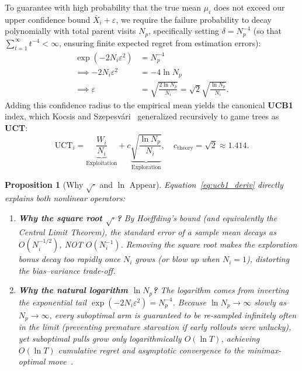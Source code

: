 \documentclass[conference]{IEEEtran}
\newtheorem{proposition}{Proposition}
\begin{document}
To guarantee with high probability that the true mean $\mu_i$ does not exceed our upper confidence bound $\bar{X}_i + \varepsilon$, we require the failure probability to decay polynomially with total parent visits $N_p$, specifically setting $\delta = N_p^{-4}$ (so that $\sum_{t=1}^{\infty} t^{-4} < \infty$, ensuring finite expected regret from estimation errors):
\begin{align}
\exp(-2 N_i \varepsilon^2) &= N_p^{-4} \nonumber \\
\implies -2 N_i \varepsilon^2 &= -4 \ln N_p \nonumber \\
\implies \varepsilon &= \sqrt{\frac{2 \ln N_p}{N_i}} = \sqrt{2} \sqrt{\frac{\ln N_p}{N_i}}.
\label{eq:ucb1_deriv}
\end{align}
Adding this confidence radius to the empirical mean yields the canonical \textbf{UCB1} index, which Kocsis and Szepesv\'ari~\cite{kocsis2006} generalized recursively to game trees as \textbf{UCT}:
\begin{equation}
\mathrm{UCT}_i = \underbrace{\frac{W_i}{N_i}}_{\text{Exploitation}} + c \underbrace{\sqrt{\frac{\ln N_p}{N_i}}}_{\text{Exploration}}, \quad c_{\text{theory}} = \sqrt{2} \approx 1.414.
\label{eq:uct}
\end{equation}

\begin{proposition}[Why $\sqrt{\cdot}$ and $\ln$ Appear]
Equation~\eqref{eq:ucb1_deriv} directly explains both nonlinear operators:
\begin{enumerate}
    \item \textbf{Why the square root $\sqrt{\cdot}$?} By Hoeffding's bound (and equivalently the Central Limit Theorem), the standard error of a sample mean decays as $O(N_i^{-1/2})$, NOT $O(N_i^{-1})$. Removing the square root makes the exploration bonus decay too rapidly once $N_i$ grows (or blow up when $N_i=1$), distorting the bias--variance trade-off.
    \item \textbf{Why the natural logarithm $\ln N_p$?} The logarithm comes from inverting the exponential tail $\exp(-2N_i\varepsilon^2) = N_p^{-4}$. Because $\ln N_p \to \infty$ slowly as $N_p \to \infty$, every suboptimal arm is guaranteed to be re-sampled infinitely often in the limit (preventing premature starvation if early rollouts were unlucky), yet suboptimal pulls grow only logarithmically $O(\ln T)$, achieving $O(\ln T)$ cumulative regret and asymptotic convergence to the minimax-optimal move~\cite{kocsis2006}.
\end{enumerate}
\end{proposition}
\end{document}
